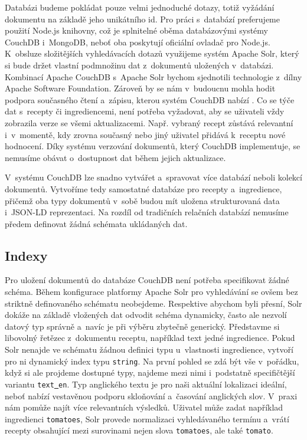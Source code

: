 Databázi budeme pokládat pouze velmi jednoduché dotazy, totiž vyžádání dokumentu na základě jeho unikátního id. Pro práci s~databází preferujeme použití Node.js knihovny, což je splnitelné oběma databázovými systémy CouchDB i~MongoDB, neboť oba poskytují oficiální ovladač pro Node.js. K~obsluze složitějších vyhledávacích dotazů využijeme systém Apache Solr, který si bude držet vlastní podmnožinu dat z~dokumentů uložených v~databázi. Kombinací Apache CouchDB s~Apache Solr bychom sjednotili technologie z~dílny Apache Software Foundation. Zároveň by se nám v~budoucnu mohla hodit podpora současného čtení a~zápisu, kterou systém CouchDB nabízí \citep{mongodb-vs-couchdb}. Co se týče dat s~recepty či ingrediencemi, není potřeba vyžadovat, aby se uživateli vždy zobrazila verze se všemi aktualizacemi. Např. vybraný recept zůstává relevantní i~v~momentě, kdy zrovna současný nebo jiný uživatel přidává k~receptu nové hodnocení. Díky systému verzování dokumentů, který CouchDB implementuje, se nemusíme obávat o~dostupnost dat během jejich aktualizace.

V~systému CouchDB lze snadno vytvářet a~spravovat více databází neboli kolekcí dokumentů. Vytvoříme tedy samostatné databáze pro recepty a~ingredience, přičemž oba typy dokumentů v~sobě budou mít uložena strukturovaná data i~JSON-LD reprezentaci. Na rozdíl od tradičních relačních databází nemusíme předem definovat žádná schémata ukládaných dat.

\subsection{Indexy}

Pro uložení dokumentů do databáze CouchDB není potřeba specifikovat žádné schéma. Během konfigurace platformy Apache Solr pro vyhledávání se ovšem bez striktně definovaného schématu neobejdeme. Respektive abychom byli přesní, Solr dokáže na základě vložených dat odvodit schéma dynamicky, často ale nezvolí datový typ správně a~navíc je při výběru zbytečně generický. Představme si libovolný řetězec z~dokumentu receptu, například text jedné ingredience. Pokud Solr nenajde ve schématu žádnou definici typu u~vlastnosti ingredience, vytvoří pro ni dynamický index typu \texttt{string}. Na první pohled se zdá být vše v~pořádku, když si ale projdeme dostupné typy, najdeme mezi nimi i~podstatně specifičtější variantu \texttt{text\underline{{ }}en}. Typ anglického textu je pro naši aktuální lokalizaci ideální, neboť nabízí vestavěnou podporu skloňování a~časování anglických slov. V~praxi nám pomůže najít více relevantních výsledků. Uživatel může zadat například ingredienci \texttt{tomatoes}, Solr provede normalizaci vyhledávaného termínu a~vrátí recepty obsahující mezi surovinami nejen slova \texttt{tomatoes}, ale také \texttt{tomato}.

